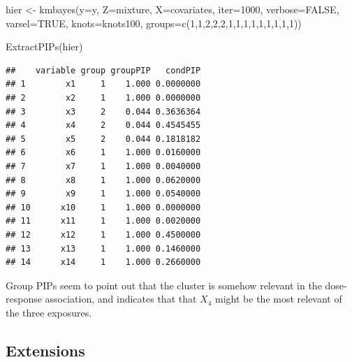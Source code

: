 \documentclass[
]{book}
\newenvironment{Shaded}{\begin{snugshade}}{\end{snugshade}}
\newcommand{\AttributeTok}[1]{\textcolor[rgb]{0.77,0.63,0.00}{#1}}
\newcommand{\ConstantTok}[1]{\textcolor[rgb]{0.00,0.00,0.00}{#1}}
\newcommand{\DecValTok}[1]{\textcolor[rgb]{0.00,0.00,0.81}{#1}}
\newcommand{\FunctionTok}[1]{\textcolor[rgb]{0.00,0.00,0.00}{#1}}
\newcommand{\NormalTok}[1]{#1}
\newcommand{\OtherTok}[1]{\textcolor[rgb]{0.56,0.35,0.01}{#1}}
\begin{document}
\begin{Shaded}
\begin{Highlighting}[]
\NormalTok{hier }\OtherTok{\textless{}{-}}  \FunctionTok{kmbayes}\NormalTok{(}\AttributeTok{y=}\NormalTok{y, }\AttributeTok{Z=}\NormalTok{mixture, }\AttributeTok{X=}\NormalTok{covariates, }\AttributeTok{iter=}\DecValTok{1000}\NormalTok{, }\AttributeTok{verbose=}\ConstantTok{FALSE}\NormalTok{, }\AttributeTok{varsel=}\ConstantTok{TRUE}\NormalTok{, }
                 \AttributeTok{knots=}\NormalTok{knots100, }\AttributeTok{groups=}\FunctionTok{c}\NormalTok{(}\DecValTok{1}\NormalTok{,}\DecValTok{1}\NormalTok{,}\DecValTok{2}\NormalTok{,}\DecValTok{2}\NormalTok{,}\DecValTok{2}\NormalTok{,}\DecValTok{1}\NormalTok{,}\DecValTok{1}\NormalTok{,}\DecValTok{1}\NormalTok{,}\DecValTok{1}\NormalTok{,}\DecValTok{1}\NormalTok{,}\DecValTok{1}\NormalTok{,}\DecValTok{1}\NormalTok{,}\DecValTok{1}\NormalTok{,}\DecValTok{1}\NormalTok{))}

\FunctionTok{ExtractPIPs}\NormalTok{(hier)}
\end{Highlighting}
\end{Shaded}

\begin{verbatim}
##    variable group groupPIP   condPIP
## 1        x1     1    1.000 0.0000000
## 2        x2     1    1.000 0.0000000
## 3        x3     2    0.044 0.3636364
## 4        x4     2    0.044 0.4545455
## 5        x5     2    0.044 0.1818182
## 6        x6     1    1.000 0.0160000
## 7        x7     1    1.000 0.0040000
## 8        x8     1    1.000 0.0620000
## 9        x9     1    1.000 0.0540000
## 10      x10     1    1.000 0.0000000
## 11      x11     1    1.000 0.0020000
## 12      x12     1    1.000 0.4500000
## 13      x13     1    1.000 0.1460000
## 14      x14     1    1.000 0.2660000
\end{verbatim}

Group PIPs seem to point out that the cluster is somehow relevant in the dose-response association, and indicates that that \(X_4\) might be the most relevant of the three exposures.

\hypertarget{extensions}{%
\subsection{Extensions}\label{extensions}}
\end{document}
